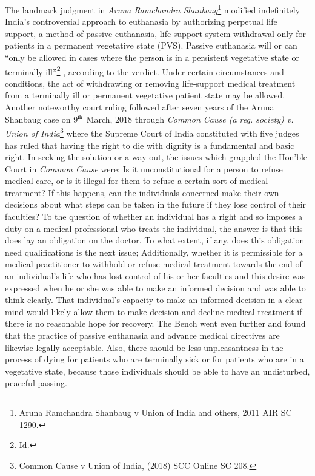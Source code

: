 \begin{multicols}{2}
\noi
The landmark judgment in \textit{Aruna Ramchandra Shanbaug}\footnote{Aruna Ramchandra Shanbaug v Union of India and others, 2011 AIR SC 1290.} modified indefinitely India’s
controversial approach to euthanasia by authorizing perpetual life support, a method of
passive euthanasia, life support system withdrawal only for patients in a permanent
vegetative state (PVS). Passive euthanasia will or can “only be allowed in cases where the
person is in a persistent vegetative state or terminally ill”\footnote{Id.}
, according to the verdict. Under certain circumstances and conditions, the act of withdrawing or removing life-support
medical treatment from a terminally ill or permanent vegetative patient state may be allowed.
Another noteworthy court ruling followed after seven years of the Aruna Shanbaug case on
9$^{\rm th}$ March, 2018 through \textit{Common Cause (a reg. society) v. Union of India}\footnote{Common Cause v Union of India, (2018) SCC Online SC 208.}
 where the Supreme Court of India constituted with five judges has ruled that having the right to die with
dignity is a fundamental and basic right. In seeking the solution or a way out, the issues
which grappled the Hon’ble Court in \textit{Common Cause} were: Is it unconstitutional for a person
to refuse medical care, or is it illegal for them to refuse a certain sort of medical treatment? If
this happens, can the individuals concerned make their own decisions about what steps can be
taken in the future if they lose control of their faculties? To the question of whether an
individual has a right and so imposes a duty on a medical professional who treats the
individual, the answer is that this does lay an obligation on the doctor. To what extent, if any,
does this obligation need qualifications is the next issue; Additionally, whether it is
permissible for a medical practitioner to withhold or refuse medical treatment towards the
end of an individual’s life who has lost control of his or her faculties and this desire was
expressed when he or she was able to make an informed decision and was able to think
clearly. That individual’s capacity to make an informed decision in a clear mind would likely
allow them to make decision and decline medical treatment if there is no reasonable hope for
recovery. The Bench went even further and found that the practice of passive euthanasia and 
advance medical directives are likewise legally acceptable. Also, there should be less
unpleasantness in the process of dying for patients who are terminally sick or for patients
who are in a vegetative state, because those individuals should be able to have an
undisturbed, peaceful passing.


\end{multicols}
